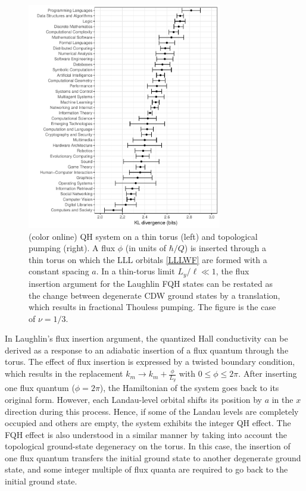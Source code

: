 \documentclass[aps,prb,twocolumn,superscriptaddress,showpacs,floatfix]{revtex4-1}
\begin{document}
\begin{figure}
\includegraphics[width=8.5cm]{Fig1.pdf}
\caption{
(color online) QH system on a thin torus (left) and topological pumping (right). A flux $\phi$ (in units of $\hbar/Q$) is inserted through a thin torus on which the LLL orbitals \eqref{LLLWF} are formed with a constant spacing $a$. In a thin-torus limit $L_y/\ell\ll 1$, the flux insertion argument for the Laughlin FQH states can be restated as the change between degenerate CDW ground states by a translation, which results in fractional Thouless pumping. 
The figure is the case of $\nu=1/3$.}
\label{fig_ttl}
\end{figure}

In Laughlin's flux insertion argument,\cite{Laughlin2} the quantized Hall conductivity can be derived as a response to an adiabatic insertion of a flux quantum through the torus. 
The effect of flux insertion is expressed by a twisted boundary condition, which results in the replacement $k_m\to k_m+\frac{\phi}{L_y}$ with $0\leq\phi\leq2\pi$. After inserting one flux quantum ($\phi=2\pi$), the Hamiltonian of the system goes back to its original form. However, each Landau-level orbital shifts its position by $a$ in the $x$ direction during this process. 
Hence, if some of the Landau levels are completely occupied and others are empty, the system exhibits the integer QH effect. The FQH effect is also understood in a similar manner by taking into account the topological ground-state degeneracy on the torus.\cite{Haldane2,TaoWu, NiuWen} In this case, the insertion of one flux quantum transfers the initial ground state to another degenerate ground state, and some integer multiple of flux quanta are required to go back to the initial ground state.
\end{document}
